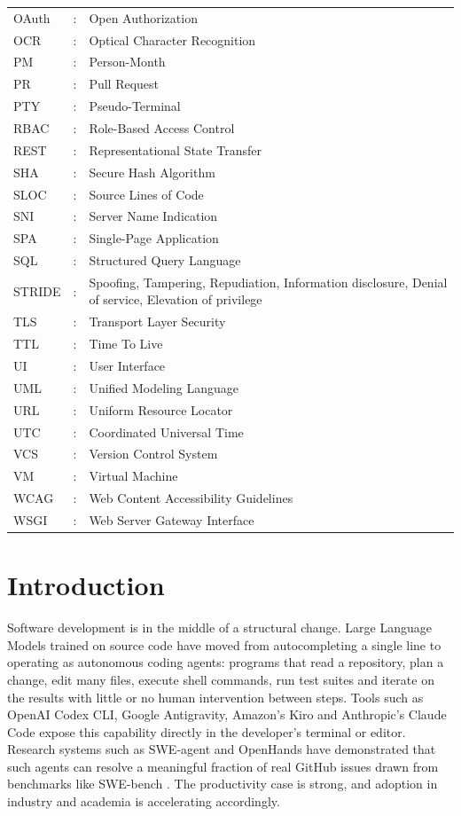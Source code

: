 \documentclass[12pt,a4paper,oneside]{report}
\begin{document}
\begin{longtable}{@{}p{1.1in}@{}p{0.25in}@{}p{4.9in}@{}}
OAuth &: & Open Authorization \\[2pt]
OCR &: & Optical Character Recognition \\[2pt]
PM &: & Person-Month \\[2pt]
PR &: & Pull Request \\[2pt]
PTY &: & Pseudo-Terminal \\[2pt]
RBAC &: & Role-Based Access Control \\[2pt]
REST &: & Representational State Transfer \\[2pt]
SHA &: & Secure Hash Algorithm \\[2pt]
SLOC &: & Source Lines of Code \\[2pt]
SNI &: & Server Name Indication \\[2pt]
SPA &: & Single-Page Application \\[2pt]
SQL &: & Structured Query Language \\[2pt]
STRIDE &: & Spoofing, Tampering, Repudiation, Information disclosure, Denial of service, Elevation of privilege \\[2pt]
TLS &: & Transport Layer Security \\[2pt]
TTL &: & Time To Live \\[2pt]
UI &: & User Interface \\[2pt]
UML &: & Unified Modeling Language \\[2pt]
URL &: & Uniform Resource Locator \\[2pt]
UTC &: & Coordinated Universal Time \\[2pt]
VCS &: & Version Control System \\[2pt]
VM &: & Virtual Machine \\[2pt]
WCAG &: & Web Content Accessibility Guidelines \\[2pt]
WSGI &: & Web Server Gateway Interface \\[2pt]
\end{longtable}

\clearpage
{}
\setcounter{page}{1}

\chapter{Introduction}\label{introduction}

Software development is in the middle of a structural change. Large Language Models trained on source code have moved from autocompleting a single line to operating as autonomous coding agents: programs that read a repository, plan a change, edit many files, execute shell commands, run test suites and iterate on the results with little or no human intervention between steps. Tools such as OpenAI Codex CLI, Google Antigravity, Amazon's Kiro and Anthropic's Claude Code expose this capability directly in the developer's terminal or editor. Research systems such as SWE-agent \cite{ref3} and OpenHands \cite{ref4} have demonstrated that such agents can resolve a meaningful fraction of real GitHub issues drawn from benchmarks like SWE-bench \cite{ref2}. The productivity case is strong, and adoption in industry and academia is accelerating accordingly.
\end{document}
